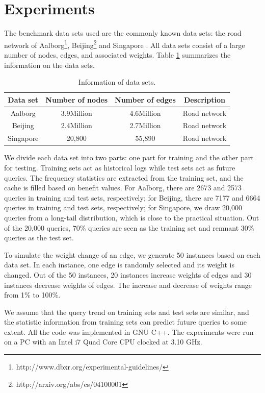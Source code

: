 \section{Experiments }
\label{sec:exp}

The benchmark data sets used are the commonly known data sets: the road network of Aalborg\footnote{http://www.dbxr.org/experimental-guidelines/}, Beijing\footnote{http://arxiv.org/abs/cs/04100001}
and Singapore \citep{Song2014PRESS}. All data sets consist of a large number of nodes, edges, and associated weights. Table \ref{tab:datasetinfo} summarizes the information on the data sets.

 \begin{table}[h]
 \caption{Information of data sets.}
 \centering
 \label{tab:datasetinfo}
{
 \begin{tabular}{|c|c|c|c|}
 \hline
  Data set   & Number of nodes &Number of edges & Description\\
  \hline
  Aalborg    &3.9Million&4.6Million&Road network\\
  \hline
   Beijing   &2.4Million&2.7Million&Road network\\
  \hline
   Singapore & 20,800&55,890&Road network\\
   \hline
 \end{tabular}
}
\end{table}

We divide each data set into two parts: one part for training and the other part for testing. Training sets act as historical logs while test sets act as future queries. The frequency statistics are extracted from the training set, and the cache is filled based on benefit values.
For Aalborg, there are 2673 and 2573 queries in training and test sets, respectively; for Beijing, there are 7177 and 6664 queries in training and test sets, respectively; for Singapore, we draw 20,000 queries from a long-tail distribution, which is close to the practical situation. Out of the 20,000 queries, 70\% queries are seen as the training set and remnant 30\% queries as the test set.

To simulate the weight change of an edge, we generate 50 instances based on each data set. In each instance, one edge is randomly selected and its weight is changed. Out of the 50 instances, 20 instances increase weights of edges and 30 instances decrease weights of edges.
The increase and decrease of weights range from 1\% to 100\%.


We assume that the query trend on training sets and test sets are similar, and the statistic information from training sets can predict future queries to some extent. All the code was implemented in GNU C++. The experiments were run on a PC with an Intel i7 Quad Core CPU clocked at 3.10 GHz.

